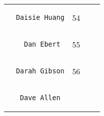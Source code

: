 \documentclass[]{article}
\begin{document}
\begin{longtable}[c]{@{}llll@{}}
\begin{minipage}[t]{0.39\columnwidth}\raggedright
\begin{verbatim}
  Daisie Huang
\end{verbatim}
\end{minipage} & \begin{minipage}[t]{0.10\columnwidth}\raggedright
54
\end{minipage} & \begin{minipage}[t]{0.13\columnwidth}\raggedright
\end{minipage} & \begin{minipage}[t]{0.15\columnwidth}\raggedright
\end{minipage}
\\\noalign{\medskip}
\begin{minipage}[t]{0.39\columnwidth}\raggedright
\begin{verbatim}
    Dan Ebert
\end{verbatim}
\end{minipage} & \begin{minipage}[t]{0.10\columnwidth}\raggedright
55
\end{minipage} & \begin{minipage}[t]{0.13\columnwidth}\raggedright
\end{minipage} & \begin{minipage}[t]{0.15\columnwidth}\raggedright
\end{minipage}
\\\noalign{\medskip}
\begin{minipage}[t]{0.39\columnwidth}\raggedright
\begin{verbatim}
  Darah Gibson
\end{verbatim}
\end{minipage} & \begin{minipage}[t]{0.10\columnwidth}\raggedright
56
\end{minipage} & \begin{minipage}[t]{0.13\columnwidth}\raggedright
\end{minipage} & \begin{minipage}[t]{0.15\columnwidth}\raggedright
\end{minipage}
\\\noalign{\medskip}
\begin{minipage}[t]{0.39\columnwidth}\raggedright
\begin{verbatim}
   Dave Allen
\end{verbatim}
\end{minipage} & \begin{minipage}[t]{0.10\columnwidth}\raggedright

\end{minipage}
\end{longtable}
\end{document}
